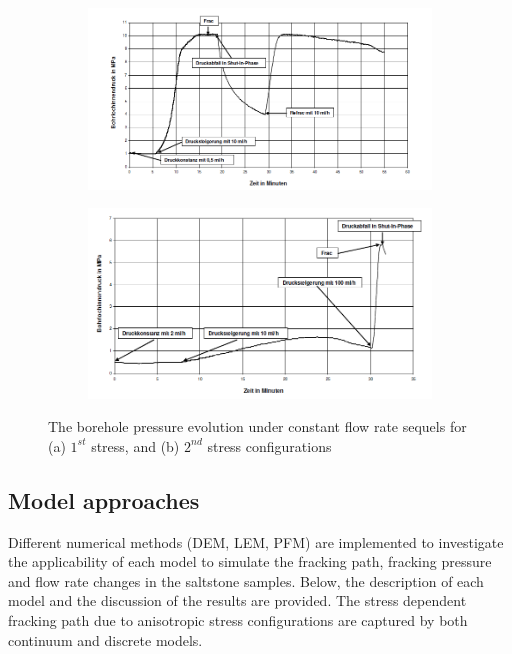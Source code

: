 \begin{figure}[!ht]
\begin{subfigure}[c]{0.48\textwidth}
\includegraphics[width=1\textwidth]{figures/Amir_ME2_Pressure_Time_1.png}
\subcaption{}
\label{fig:Amir_ME2_Pressure_Time_a}
\end{subfigure}
\hfill
\begin{subfigure}[c]{0.48\textwidth}
\includegraphics[width=1\textwidth]{figures/Amir_ME2_Pressure_Time_2.png}
\subcaption{}
\label{fig:Amir_ME2_Pressure_Time_b}
\end{subfigure}
\caption{The borehole pressure evolution under constant flow rate sequels for (a) $1^{st}$ stress, and (b) $2^{nd}$ stress configurations \cite{Kamlot2009}}
\end{figure}
\subsection{Model approaches}
Different numerical methods (DEM, LEM, PFM) are implemented to investigate the applicability of each model to simulate the fracking path, fracking pressure and flow rate changes in the saltstone samples. Below, the description of each model and the discussion of the results are provided. The stress dependent fracking path due to anisotropic stress configurations are captured by both continuum and discrete models. 
